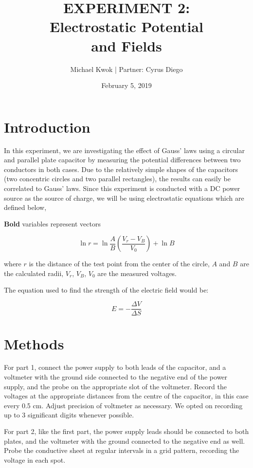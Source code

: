 \documentclass[12pt]{article}
\title{EXPERIMENT 2: \protect\\ Electrostatic Potential \protect\\ and Fields}
\date{February 5, 2019}
\author{Michael Kwok | Partner: Cyrus Diego }
\begin{document}
\maketitle
\pagebreak

\section{Introduction}

In this experiment, we are investigating the effect of Gauss’ laws using a
circular and parallel plate capacitor by measuring the potential differences
between two conductors in both cases. Due to the relatively simple shapes of the
capacitors (two concentric circles and two parallel rectangles), the results can
easily be correlated to Gauss’ laws. Since this experiment is conducted with a
DC power source as the source of charge, we will be using electrostatic
equations which are defined below,

\textbf{Bold} variables represent vectors

\begin{equation} \label{eq:ln_eq}
    \ln r = \ln \frac{A}{B}(\frac{V_r-V_B}{V_0})+\ln B
\end{equation}

where $r$  is the distance of the test point from the center of the circle, $A$
and $B$ are the calculated radii, $V_r$, $V_B$, $V_0$ are the measured voltages.

The equation used to find the strength of the electric field would be:

\begin{equation} \label{eq:ef_strength}
    E=-\frac{\Delta V}{\Delta S}
\end{equation}

\section{Methods}

For part 1, connect the power supply to both leads of the capacitor, and a
voltmeter with the ground side connected to the negative end of the power
supply, and the probe on the appropriate slot of the voltmeter. Record the
voltages at the appropriate distances from the centre of the capacitor, in this
case every 0.5 cm. Adjust precision of voltmeter as necessary. We opted on
recording up to 3 significant digits whenever possible.

For part 2, like the first part, the power supply leads should be connected to
both plates, and the voltmeter with the ground connected to the negative end as
well. Probe the conductive sheet at regular intervals in a grid pattern,
recording the voltage in each spot.
\end{document}
